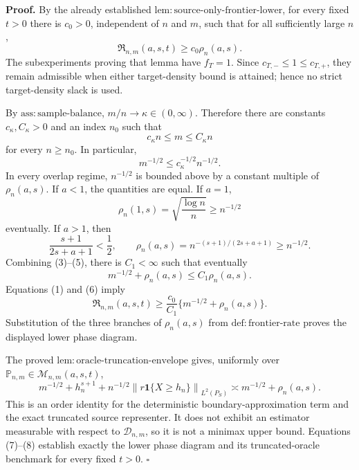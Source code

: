 \textbf{Proof.}
By the already established \(\mathrm{lem:source\text{-}only\text{-}frontier\text{-}lower}\), for every fixed \(t>0\) there is \(c_0>0\), independent of \(n\) and \(m\), such that for all sufficiently large \(n\),
\[
\mathfrak R_{n,m}(a,s,t)\ge c_0\rho_n(a,s).
\tag{1}
\]
The subexperiments proving that lemma have \(f_T=1\). Since \(c_{T,-}\le1\le c_{T,+}\), they remain admissible when either target-density bound is attained; hence no strict target-density slack is used.

By \(\mathrm{ass:sample\text{-}balance}\), \(m/n\to\kappa\in(0,\infty)\). Therefore there are constants \(c_\kappa,C_\kappa>0\) and an index \(n_0\) such that
\[
c_\kappa n\le m\le C_\kappa n
\tag{2}
\]
for every \(n\ge n_0\). In particular,
\[
m^{-1/2}\le c_\kappa^{-1/2}n^{-1/2}.
\tag{3}
\]
In every overlap regime, \(n^{-1/2}\) is bounded above by a constant multiple of \(\rho_n(a,s)\). If \(a<1\), the quantities are equal. If \(a=1\),
\[
\rho_n(1,s)=\sqrt{\frac{\log n}{n}}\ge n^{-1/2}
\tag{4}
\]
eventually. If \(a>1\), then
\[
\frac{s+1}{2s+a+1}<\frac12,
\qquad
\rho_n(a,s)=n^{-(s+1)/(2s+a+1)}\ge n^{-1/2}.
\tag{5}
\]
Combining (3)--(5), there is \(C_1<\infty\) such that eventually
\[
m^{-1/2}+\rho_n(a,s)\le C_1\rho_n(a,s).
\tag{6}
\]
Equations (1) and (6) imply
\[
\mathfrak R_{n,m}(a,s,t)
\ge \frac{c_0}{C_1}\{m^{-1/2}+\rho_n(a,s)\}.
\tag{7}
\]
Substitution of the three branches of \(\rho_n(a,s)\) from \(\mathrm{def:frontier\text{-}rate}\) proves the displayed lower phase diagram.

The proved \(\mathrm{lem:oracle\text{-}truncation\text{-}envelope}\) gives, uniformly over \(\mathbb P_{n,m}\in\mathcal M_{n,m}(a,s,t)\),
\[
m^{-1/2}+h_n^{s+1}
+n^{-1/2}\left\|r\mathbf 1\{X\ge h_n\}\right\|_{L^2(P_S)}
\asymp m^{-1/2}+\rho_n(a,s).
\tag{8}
\]
This is an order identity for the deterministic boundary-approximation term and the exact truncated source representer. It does not exhibit an estimator measurable with respect to \(\mathcal D_{n,m}\), so it is not a minimax upper bound. Equations (7)--(8) establish exactly the lower phase diagram and its truncated-oracle benchmark for every fixed \(t>0\). \(\square\)